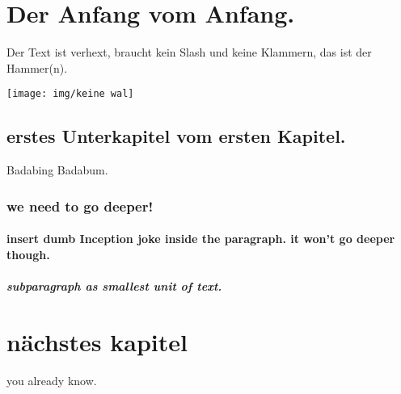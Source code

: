\documentclass{article}
\begin{document}
    \tableofcontents
    
    \section{Der Anfang vom Anfang.}
    Der Text ist verhext, braucht kein Slash und keine Klammern, 
    das ist der Hammer(n).

        \texttt{[image: img/keine wal]}

        \subsection {erstes Unterkapitel vom ersten Kapitel.}
        Badabing Badabum.

            \subsubsection{we need to go deeper!}

                \paragraph{insert dumb Inception joke inside the paragraph. it won't go deeper though.} 
                   
                    \subparagraph{subparagraph as smallest unit of text.}

    \section{nächstes kapitel}
    you already know. 
\end{document}
